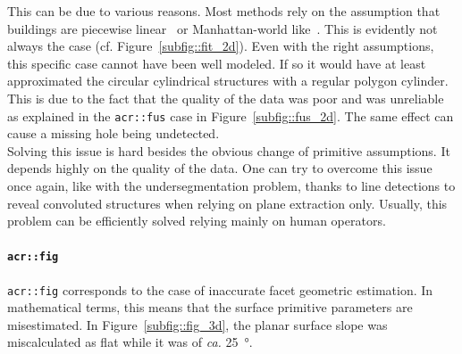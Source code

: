                 This can be due to various reasons.
                Most methods rely on the assumption that buildings are piecewise linear~\parencite{nan2017polyfit} or Manhattan-world like~\parencite{li2016manhattan}.
                This is evidently not always the case (cf. Figure~\ref{subfig::fit_2d}).
                Even with the right assumptions, this specific case cannot have been well modeled.
                If so it would have at least approximated the circular cylindrical structures with a regular polygon cylinder.
                This is due to the fact that the quality of the data was poor and was unreliable as explained in the \texttt{\gls{acr::fus}} case in Figure~\ref{subfig::fus_2d}.
                The same effect can cause a missing hole being undetected.\\

                Solving this issue is hard besides the obvious change of primitive assumptions.
                It depends highly on the quality of the data.
                One can try to overcome this issue once again, like with the undersegmentation problem, thanks to line detections to reveal convoluted structures when relying on plane extraction only.
                Usually, this problem can be efficiently solved relying mainly on human operators.

            \paragraph{\texttt{\acrlong*{acr::fig}}}
                \texttt{\gls{acr::fig}} corresponds to the case of inaccurate facet geometric estimation.
                In mathematical terms, this means that the surface primitive parameters are misestimated.
                In Figure~\ref{subfig::fig_3d}, the planar surface slope was miscalculated as flat while it was of \textit{ca.} \SI{25}{\degree}.\\

